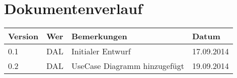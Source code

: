 \newpage
\section*{Dokumentenverlauf}
\begin{center}
	\begin{tabular}{  llp{9cm}l }
		\textbf{Version} & \textbf{Wer} & \textbf{Bemerkungen} & \textbf{Datum} \\\hline
		0.1 & DAL & Initialer Entwurf & 17.09.2014 \\
		0.2 & DAL & UseCase Diagramm hinzugefügt & 19.09.2014 \\
	\end{tabular}
\end{center}
\newpage
